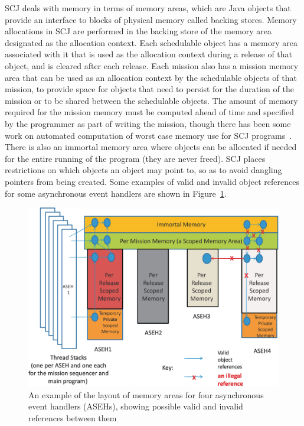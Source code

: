 SCJ deals with memory in terms of memory areas, which are Java objects
that provide an interface to blocks of physical memory called backing
stores.
Memory allocations in SCJ are performed in the backing store of the
memory area designated as the allocation context.
Each schedulable object has a memory area associated with it that is
used as the allocation context during a release of that object, and is
cleared after each release.
Each mission also has a mission memory area that can be used as an
allocation context by the schedulable objects of that mission, to
provide space for objects that need to persist for the duration of the
mission or to be shared between the schedulable objects.
The amount of memory required for the mission memory must be computed
ahead of time and specified by the programmer as part of writing the
mission, though there has been some work on automated computation of
worst case memory use for SCJ programs~\cite{andersen2013}.
There is also an immortal memory area where objects can be allocated
if needed for the entire running of the program (they are never
freed).
SCJ places restrictions on which objects an object may point to, so as
to avoid dangling pointers from being created.
Some examples of valid and invalid object references for some
asynchronous event handlers are shown in
Figure~\ref{stacks-areas-diagram}.

\begin{figure}[ht]
  \includegraphics[width=\textwidth]{Stacks-Areas.pdf}
  \caption{An example of the layout of memory areas for four
    asynchronous event handlers (ASEHs), showing possible valid and
    invalid references between them}
  \label{stacks-areas-diagram}
\end{figure}

